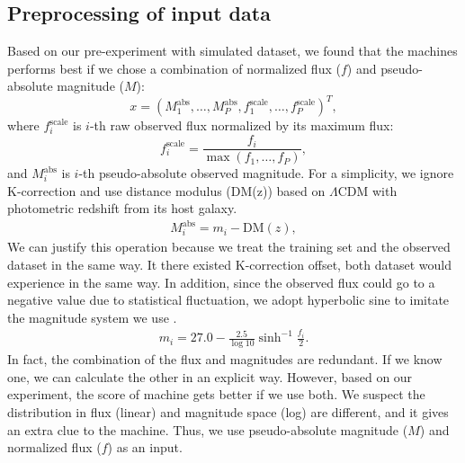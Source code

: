 \documentclass[proof]{pasj01}
\begin{document}
\subsection{Preprocessing of input data}
\label{sec:preproc}
Based on our pre-experiment with simulated dataset, we found that the machines performs best if we 
chose a combination of normalized flux ($f$) and pseudo-absolute magnitude ($M$):
\begin{equation}
    x = \left( M_1^\mathrm{abs}, \ldots, M_P^\mathrm{abs}, f_{1}^{\mathrm{scale}}, \ldots, f_{P}^{\mathrm{scale}} \right)^T,
\end{equation}
where $f_{i}^{\mathrm{scale}}$ is $i$-th raw observed flux normalized by its maximum flux:
\begin{equation}
    f_{i}^{\mathrm{scale}} = \frac{f_i}{\max \left(f_1, \ldots, f_P \right)},    \label{eq:scaled_flux}
\end{equation}
and $M_i^\mathrm{abs}$ is $i$-th pseudo-absolute observed magnitude.
For a simplicity, we ignore K-correction and use distance modulus (DM(z)) based on $\Lambda$CDM with photometric redshift
from its host galaxy.
\begin{eqnarray}
    M_i^\mathrm{abs} = m_i - \mathrm{DM}\left(z\right),
\end{eqnarray}
We can justify this operation because we treat the training set and the observed dataset in the same way.
It there existed K-correction offset, both dataset would experience in the same way.
In addition, since the observed flux could go to a negative value due to statistical fluctuation, 
we adopt hyperbolic sine to imitate the magnitude system we use \citep{lupton99a}.  
\begin{eqnarray}
    m_i = 27.0 - \frac{2.5}{\log 10} \sinh^{-1} \frac{f_i}{2}. \label{eq:mag} 
\end{eqnarray}
In fact, the combination of the flux and magnitudes are redundant.   If we know one, we can calculate the other
in an explicit way.   
However, based on our experiment, the score of machine gets better if we use both.  
We suspect the distribution in flux (linear) and magnitude space (log) are different, 
and it gives an extra clue to the machine.
Thus, we use pseudo-absolute magnitude ($M$) and normalized flux ($f$) as an input.
\end{document}
